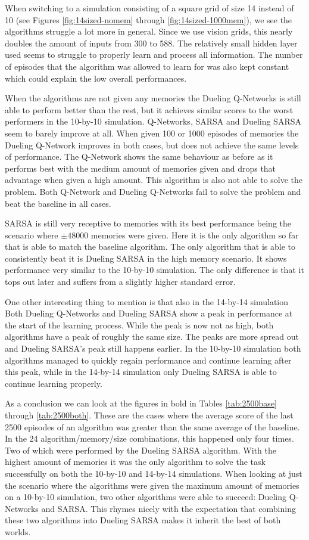 When switching to a simulation consisting of a square grid of size 14 instead of 10 (see Figures \ref{fig:14sized-nomem} through \ref{fig:14sized-1000mem}), we see the algorithms struggle a lot more in general. Since we use vision grids, this nearly doubles the amount of inputs from 300 to 588. The relatively small hidden layer used seems to struggle to properly learn and process all information. The number of episodes that the algorithm was allowed to learn for was also kept constant which could explain the low overall performances.

When the algorithms are not given any memories the Dueling Q-Networks is still able to perform better than the rest, but it achieves similar scores to the worst performers in the 10-by-10 simulation. Q-Networks, SARSA and Dueling SARSA seem to barely improve at all. When given 100 or 1000 episodes of memories the Dueling Q-Network improves in both cases, but does not achieve the same levels of performance. The Q-Network shows the same behaviour as before as it performs best with the medium amount of memories given and drops that advantage when given a high amount. This algorithm is also not able to solve the problem. Both Q-Network and Dueling Q-Networks fail to solve the problem and beat the baseline in all cases.

SARSA is still very receptive to memories with its best performance being the scenario where $\pm 48000$ memories were given. Here it is the only algorithm so far that is able to match the baseline algorithm. The only algorithm that is able to consistently beat it is Dueling SARSA in the high memory scenario. It shows performance very similar to the 10-by-10 simulation. The only difference is that it tops out later and suffers from a slightly higher standard error.

One other interesting thing to mention is that also in the 14-by-14 simulation Both Dueling Q-Networks and Dueling SARSA show a peak in performance at the start of the learning process. While the peak is now not as high, both algorithms have a peak of roughly the same size. The peaks are more spread out and Dueling SARSA's peak still happens earlier. In the 10-by-10 simulation both algorithms managed to quickly regain performance and continue learning after this peak, while in the 14-by-14 simulation only Dueling SARSA is able to continue learning properly.

As a conclusion we can look at the figures in bold in Tables \ref{tab:2500base} through \ref{tab:2500both}. These are the cases where the average score of the last 2500 episodes of an algorithm was greater than the same average of the baseline. In the 24 algorithm/memory/size combinations, this happened only four times. Two of which were performed by the Dueling SARSA algorithm. With the highest amount of memories it was the only algorithm to solve the task successfully on both the 10-by-10 and 14-by-14 simulations. When looking at just the scenario where the algorithms were given the maximum amount of memories on a 10-by-10 simulation, two other algorithms were able to succeed: Dueling Q-Networks and SARSA. This rhymes nicely with the expectation that combining these two algorithms into Dueling SARSA makes it inherit the best of both worlds.

